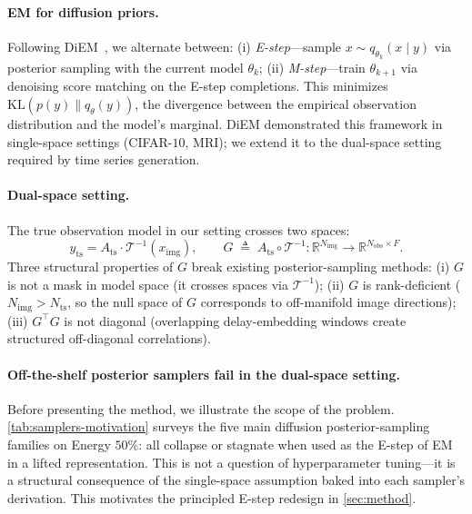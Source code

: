 \documentclass{article}
\theoremstyle{plain}
\theoremstyle{definition}
\theoremstyle{remark}
\newcommand{\imgts}{\mathcal{T}^{-1}}
\newcommand{\Nts}{N_{\mathrm{ts}}}
\newcommand{\Nimg}{N_{\mathrm{img}}}
\newcommand{\Nobs}{N_{\mathrm{obs}}}
\newcommand{\Ats}{A_{\mathrm{ts}}}
\newcommand{\yts}{y_{\mathrm{ts}}}
\newcommand{\ximg}{x_{\mathrm{img}}}
\begin{document}
\paragraph{EM for diffusion priors.}
Following DiEM~\citep{rozet2024diem}, we alternate between: (i) \emph{E-step}---sample $x \sim q_{\theta_k}(x \mid y)$ via posterior sampling with the current model $\theta_k$; (ii) \emph{M-step}---train $\theta_{k+1}$ via denoising score matching on the E-step completions. This minimizes $\mathrm{KL}(p(y) \| q_\theta(y))$, the divergence between the empirical observation distribution and the model's marginal. DiEM demonstrated this framework in single-space settings (CIFAR-$10$, MRI); we extend it to the dual-space setting required by time series generation.

\paragraph{Dual-space setting.}
The true observation model in our setting crosses two spaces:
\begin{equation}
\yts = \Ats \cdot \imgts(\ximg), \qquad G \;\triangleq\; \Ats \circ \imgts : \mathbb{R}^{\Nimg} \to \mathbb{R}^{\Nobs \times F}.
\end{equation}
Three structural properties of $G$ break existing posterior-sampling methods: (i) $G$ is not a mask in model space (it crosses spaces via $\imgts$); (ii) $G$ is rank-deficient ($\Nimg > \Nts$, so the null space of $G$ corresponds to off-manifold image directions); (iii) $G^\top G$ is not diagonal (overlapping delay-embedding windows create structured off-diagonal correlations).

\paragraph{Off-the-shelf posterior samplers fail in the dual-space setting.}
Before presenting the method, we illustrate the scope of the problem. \cref{tab:samplers-motivation} surveys the five main diffusion posterior-sampling families on Energy $50\%$: all collapse or stagnate when used as the E-step of EM in a lifted representation. This is not a question of hyperparameter tuning---it is a structural consequence of the single-space assumption baked into each sampler's derivation. This motivates the principled E-step redesign in \cref{sec:method}.
\end{document}

